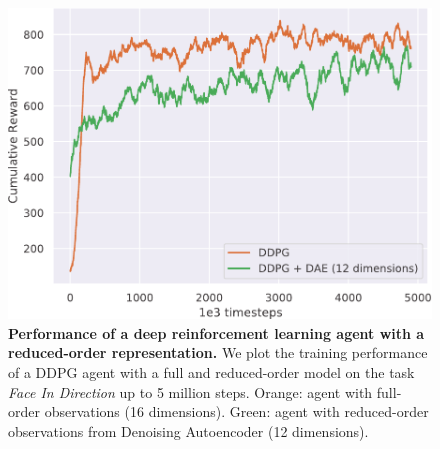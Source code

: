 \documentclass{article}
\begin{document}
\begin{figure}[t]
    \centering
    \includegraphics[width=.9\linewidth]{figure7plus}
    \caption{
        \textbf{Performance of a deep reinforcement learning agent with a reduced-order representation.}
        We plot the training performance of a DDPG agent with a full and reduced-order model on the task \textit{Face In Direction} up to 5 million steps.
        Orange: agent with full-order observations (16 dimensions).
        Green: agent with reduced-order observations from Denoising Autoencoder (12 dimensions).
\vspace*{-12pt}
    }
    \label{fig:ae-perf}
\end{figure}
\end{document}
